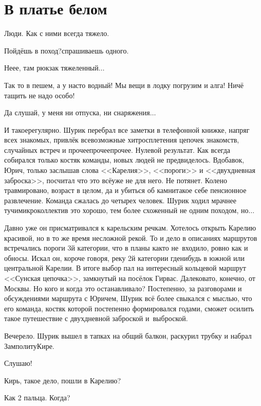 \chapter{В платье белом}
\vepsianrose

Люди. Как с ними всегда тяжело.

\diagdash Пойдёшь в поход?\mdash спрашиваешь одного.

\diagdash Не\sdash е\sdash е, там рюкзак тяжеленный$\ldots$

\diagdash Так то в пешем, а у нас\sdash то водный! Мы вещи в лодку погрузим и алга! Ничё тащить не надо особо!

\diagdash Да слушай, у меня ни отпуска, ни снаряжения$\ldots$

И такое\mdash регулярно. Шурик перебрал все заметки в телефонной книжке, напряг всех знакомых, привлёк всевозможные хитросплетения цепочек знакомств, случайных встреч и прочее\sdash прочее\sdash прочее. Нулевой результат. Как всегда собирался только костяк команды, новых людей не предвиделось. Вдобавок, Юрич, только заслышав слова <<Карелия>>, <<пороги>> и <<двухдневная заброска>>, посчитал что это всё\mdash уже не для него. Не потянет. Колено травмировано, возраст в целом, да и убиться об камни\mdash такое себе пенсионное развлечение. Команда сжалась до четырех человек. Шурик ходил мрачнее тучи\mdash микроколлектив это хорошо, тем более схоженный не одним походом, но$\ldots$

Давно уже он присматривался к карельским речкам. Хотелось открыть Карелию красивой, но в то же время несложной рекой. То и дело в описаниях маршрутов встречались пороги 3\sdash й категории, что в планы как\sdash то не~входило, ровно как и обносы. Искал он, короче говоря, реку 2\sdash й категории где\sdash нибудь в южной или центральной Карелии. В итоге выбор пал на интересный кольцевой маршрут <<Сунская цепочка>>, замкнутый на посёлок Гирвас. Далековато, конечно, от Москвы. Но кого и когда это останавливало? Постепенно, за разговорами и обсуждениями маршрута с Юричем, Шурик всё более свыкался с мыслью, что его команда, костяк которой постепенно формировался годами, сможет осилить такое путешествие с двухдневной заброской и~выброской. 

Вечерело. Шурик вышел в тапках на общий балкон, раскурил трубку и набрал Замполиту\mdash Кире.

\diagdash Слушаю!

\diagdash Кирь, такое дело, пошли в Карелию?

\diagdash Как 2 пальца. Когда?

